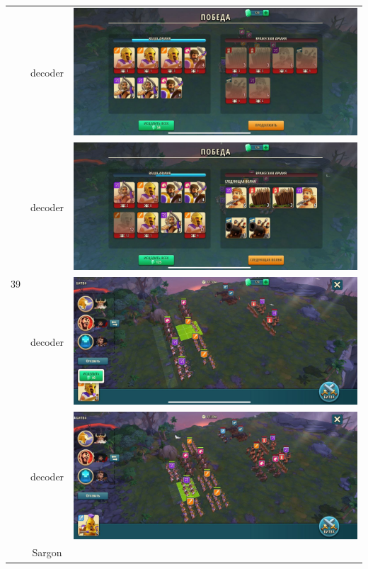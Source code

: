 \begin{longtable}{|c|c|c|}
    \hline
    \multirow{8}{*}{39} & decoder &
    \includegraphics[width=0.75\linewidth]{./parts/media/TreasureHunt/39/decoder/photo_2022-04-07_13-15-43.jpg} \\
    & decoder &
    \includegraphics[width=0.75\linewidth]{./parts/media/TreasureHunt/39/decoder/photo_2022-04-07_13-15-36.jpg} \\
    & decoder &
    \includegraphics[width=0.75\linewidth]{./parts/media/TreasureHunt/39/decoder/photo_2022-04-07_13-15-39.jpg} \\
    & decoder &
    \includegraphics[width=0.75\linewidth]{./parts/media/TreasureHunt/39/decoder/photo_2022-04-07_13-15-27.jpg} \\
    \hline
    \multirow{8}{*}{39} & Sargon &

\end{longtable}

